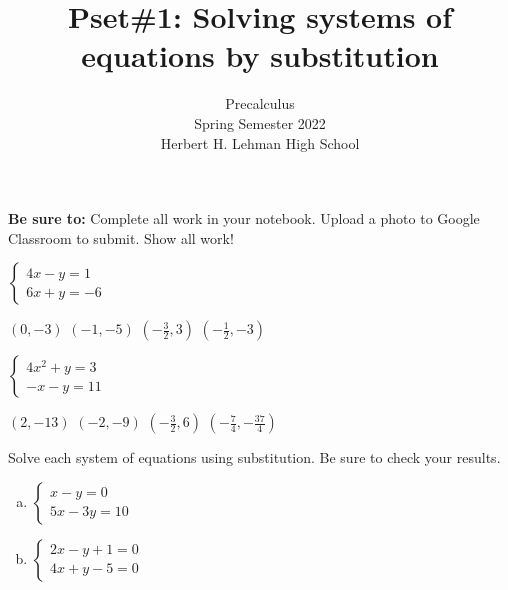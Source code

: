 \documentclass{exam}
\title{Pset\#1: Solving systems of equations by substitution }
\author{Precalculus \\ Spring Semester 2022 \\ Herbert H. Lehman High School}
\begin{document}
\maketitle
\noindent\textbf{Be sure to: } Complete all work in your notebook. Upload a photo to Google Classroom to submit.  Show all work!
\vspace{5mm}





\begin{questions}

\begin{multicols}{2}
\question 

$
\begin{cases}
4x - y = 1\\
6x + y = -6
\end{cases}
$
\vspace{3mm}
\begin{choices}
\choice $(0,-3)$
\choice $(-1,-5)$
\choice $(-\frac{3}{2}, 3 )$
\choice $(-\frac{1}{2},-3) $
\end{choices}

\columnbreak
\question 

$ 
\begin{cases}
4x^2 + y = 3\\
-x -y = 11
\end{cases}
$
\vspace{3mm}
\begin{choices}
\choice $(2,-13)$
\choice $(-2,-9)$
\choice $(-\frac{3}{2}, 6 )$
\choice $(-\frac{7}{4},-\frac{37}{4}) $
\end{choices}
\end{multicols}

\question
Solve each system of equations using substitution. Be sure to check your results.
\begin{multicols}{2}
\begin{enumerate}[a.]
\item
$
\begin{cases}
x - y = 0\\
5x - 3y = 10
\end{cases}
$

\item

$
\begin{cases}
2x - y + 1 = 0\\
4x + y - 5  = 0
\end{cases}
$


\end{enumerate}
\end{multicols}
\end{questions}
\end{document}
